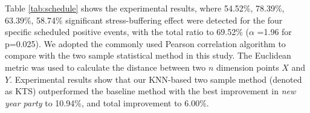 \begin{table}[H]
\begin{center}
\caption{\small{Quantify the impact of scheduled positive school events using KTS (the KNN-based two sample method adopted in this research) and baseline method.}}
\label{tab:schedule}
\end{center}
\end{table}

Table \ref{tab:schedule} shows the experimental results, 
where 54.52\%, 78.39\%, 63.39\%, 58.74\% significant stress-buffering effect were detected for the four specific scheduled positive events, 
with the total ratio to 69.52\% ($\alpha$ =1.96 for p=0.025). 
We adopted the commonly used Pearson correlation algorithm to compare with the two sample statistical method in this study. 
The Euclidean metric was used to calculate the distance between two $n$ dimension points $X$ and $Y$.
Experimental results show that our KNN-based two sample method (denoted as KTS) outperformed the baseline method 
with the best improvement in \emph{new year party} to 10.94\%, 
and total improvement to 6.00\%.


